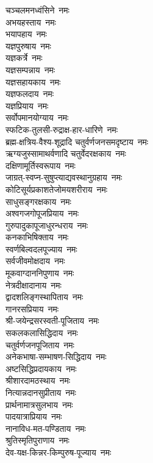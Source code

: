 \begin{flushleft}
\begin{multicols}{2}
चञ्चलमनध्वंसिने~नमः\\
अभयहस्ताय~नमः\\
भयापहाय~नमः\\
यज्ञपुरुषाय~नमः\hfill{}\\
यज्ञकर्त्रे~नमः\\
यज्ञसम्पन्नाय~नमः\\
यज्ञसहायकाय~नमः\\
यज्ञफलदाय~नमः\\
यज्ञप्रियाय~नमः\\
सर्वोपमानयोग्याय~नमः\\
स्फटिक-तुलसी-रुद्राक्ष-हार-धारिणे~नमः\\
ब्रह्म-क्षत्रिय-वैश्य-शूद्रादि चतुर्वर्णजनसमदृष्टाय~नमः\\
ऋग्यजुस्सामाथर्वणादि चतुर्वेदरक्षकाय~नमः\\
दक्षिणामूर्तिस्वरूपाय~नमः\hfill{}\\
जाग्रत्-स्वप्न-सुषुप्त्याद्यवस्थानुग्रहाय~नमः\\
कोटिसूर्यप्रकाशतेजोमय\-शरीराय~नमः\\
साधुसङ्गरक्षकाय~नमः\\
अश्वगजगोपूजप्रियाय~नमः\\
गुरुपादुकापूजाधुरन्धराय~नमः\\
कनकाभिषिक्ताय~नमः\\
स्वर्णबिल्वदलपूज्याय~नमः\\
सर्वजीवमोक्षदाय~नमः\\
मूकवाग्दाननिपुणाय~नमः\\
नेत्रदीक्षादानाय~नमः\hfill{}\\
द्वादशलिङ्गस्थापिताय~नमः\\
गानरसप्रियाय~नमः\\
श्री-जयेन्द्रसरस्वती-पूजिताय~नमः\\
सकलकलासिद्धिदाय~नमः\\
चतुर्वर्णजनपूजिताय~नमः\\
अनेकभाषा-सम्भाषण-सिद्धिदाय~नमः\\
अष्टसिद्धिप्रदायकाय~नमः\\
श्रीशारदामठस्थाय~नमः\\
नित्यान्नदानसुप्रीताय~नमः\\
प्रार्थनामात्रसुलभाय~नमः\hfill{}\\
पादयात्राप्रियाय~नमः\\
नानाविध-मत-पण्डिताय~नमः\\
श्रुतिस्मृतिपुराणाय~नमः\\
देव-यक्ष-किन्नर-किम्पुरुष-पूज्याय~नमः\\

\end{multicols}
\end{flushleft}
